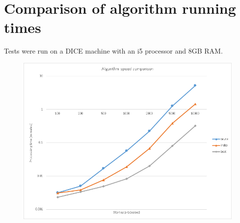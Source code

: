 \documentclass{article}
\begin{document}
\section{Comparison of algorithm running times}
Tests were run on a DICE machine with an i5 processor and 8GB RAM.
\begin{figure}[ht!]
\centering
\includegraphics[width=165mm]{algos2.png}
\end{figure}
\end{document}
